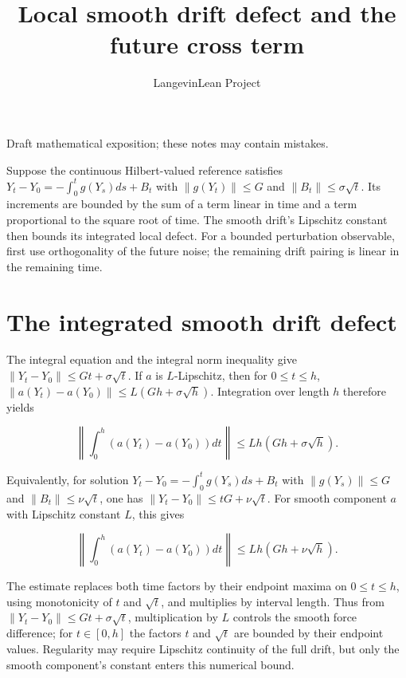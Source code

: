 \documentclass[11pt,a4paper]{article}
\title{\texorpdfstring{Local smooth drift defect and the future cross term}{Local smooth drift defect and the future cross term}}
\author{LangevinLean Project}
\date{}
\begin{document}
\maketitle
Draft mathematical exposition; these notes may contain mistakes.


Suppose the continuous Hilbert-valued reference satisfies \(Y_t-Y_0=-\int_0^t g(Y_s)ds+B_t\) with \(\|g(Y_t)\|\le G\) and \(\|B_t\|\le\sigma\sqrt t\). Its increments are bounded by the sum of a term linear in time and a term proportional to the square root of time. The smooth drift’s Lipschitz constant then bounds its integrated local defect. For a bounded perturbation observable, first use orthogonality of the future noise; the remaining drift pairing is linear in the remaining time.


\section{\texorpdfstring{The integrated smooth drift defect}{The integrated smooth drift defect}}


The integral equation and the integral norm inequality give \(\|Y_t-Y_0\|\le Gt+\sigma\sqrt t\). If \(a\) is \(L\)-Lipschitz, then for \(0\le t\le h\), \(\|a(Y_t)-a(Y_0)\|\le L(Gh+\sigma\sqrt h)\). Integration over length \(h\) therefore yields

\[\left\|\int_0^h(a(Y_t)-a(Y_0))dt\right\|\le Lh(Gh+\sigma\sqrt h).\]

Equivalently, for solution \(Y_t-Y_0=-\int_0^t g(Y_s)ds+B_t\) with \(\|g(Y_s)\|\le G\) and \(\|B_t\|\le\nu\sqrt t\), one has \(\|Y_t-Y_0\|\le tG+\nu\sqrt t\). For smooth component \(a\) with Lipschitz constant \(L\), this gives

\[\left\|\int_0^h(a(Y_t)-a(Y_0))dt\right\|\le Lh(Gh+\nu\sqrt h).\]

The estimate replaces both time factors by their endpoint maxima on \(0\le t\le h\), using monotonicity of \(t\) and \(\sqrt t\), and multiplies by interval length. Thus from \(\|Y_t-Y_0\|\le Gt+\sigma\sqrt t\), multiplication by \(L\) controls the smooth force difference; for \(t\in[0,h]\) the factors \(t\) and \(\sqrt t\) are bounded by their endpoint values. Regularity may require Lipschitz continuity of the full drift, but only the smooth component’s constant enters this numerical bound.
\end{document}
